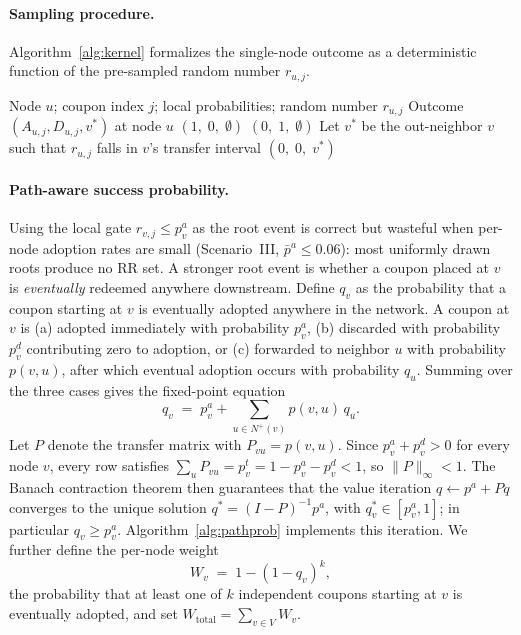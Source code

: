 \documentclass[sigconf]{acmart}
\begin{document}
\paragraph{Sampling procedure.}
Algorithm~\ref{alg:kernel} formalizes the single-node outcome as a deterministic function of the pre-sampled random number $r_{u,j}$.

\begin{algorithm}[t]
\caption{Single-Node Transition Kernel in World $W_j$}
\label{alg:kernel}
\begin{algorithmic}[1]
\Require Node $u$; coupon index $j$; local probabilities; random number $r_{u,j}$
\Ensure Outcome $(A_{u,j}, D_{u,j}, v^*)$ at node $u$
  \State \Return $(1,\; 0,\; \emptyset)$ 
  \State \Return $(0,\; 1,\; \emptyset)$ 
\Else
  \State Let $v^*$ be the out-neighbor $v$ such that $r_{u,j}$ falls in $v$'s transfer interval
  \State \Return $(0,\; 0,\; v^*)$ 
\EndIf
\end{algorithmic}
\end{algorithm}

\paragraph{Path-aware success probability.}
Using the local gate $r_{v,j} \leq p_v^a$ as the root event is correct but wasteful when per-node adoption rates are small (Scenario~III, $\bar{p}^a \leq 0.06$): most uniformly drawn roots produce no RR set. A stronger root event is whether a coupon placed at $v$ is \emph{eventually} redeemed anywhere downstream. Define $q_v$ as the probability that a coupon starting at $v$ is eventually adopted anywhere in the network. A coupon at $v$ is (a) adopted immediately with probability $p_v^a$, (b) discarded with probability $p_v^d$ contributing zero to adoption, or (c) forwarded to neighbor $u$ with probability $p(v,u)$, after which eventual adoption occurs with probability $q_u$. Summing over the three cases gives the fixed-point equation
\[
  q_v \;=\; p_v^a + \sum_{u \in N^+(v)} p(v,u)\, q_u.
\]
Let $P$ denote the transfer matrix with $P_{vu} = p(v,u)$. Since $p_v^a + p_v^d > 0$ for every node $v$, every row satisfies $\sum_u P_{vu} = p_v^t = 1 - p_v^a - p_v^d < 1$, so $\|P\|_\infty < 1$. The Banach contraction theorem then guarantees that the value iteration $q \leftarrow p^a + Pq$ converges to the unique solution $q^* = (I-P)^{-1}p^a$, with $q_v^* \in [p_v^a, 1]$; in particular $q_v \geq p_v^a$. Algorithm~\ref{alg:pathprob} implements this iteration. We further define the per-node weight
\[
  W_v \;=\; 1 - (1 - q_v)^k,
\]
the probability that at least one of $k$ independent coupons starting at $v$ is eventually adopted, and set $W_{\mathrm{total}} = \sum_{v \in V} W_v$.
\end{document}
